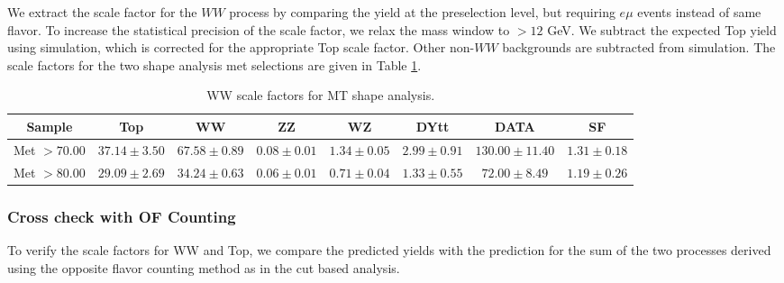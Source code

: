 We extract the scale factor for the $WW$ process by comparing the
yield at the preselection level, but requiring $e\mu$ events instead
of same flavor. 
To increase the statistical precision of the scale factor,
we relax the mass window to $>12$ GeV.
We subtract the expected Top yield using simulation, which is 
corrected for the appropriate Top scale factor.  
Other non-$WW$ backgrounds are subtracted from simulation.
The scale factors for the two shape analysis met selections
are given in Table \ref{tab:yield_of_0jet_wwsf}.

\begin{table}[!ht]
\begin{center}
\small{
\begin{tabular}{c|c|c|c|c|c|c|c}
\hline
Sample & Top & WW & ZZ & WZ & DYtt & DATA & SF \\ \hline
Met $> 70.00$ & $37.14 \pm 3.50$ & $67.58 \pm 0.89$ & $0.08 \pm 0.01$ & $1.34 \pm 0.05$ & $2.99 \pm 0.91$ & $130.00 \pm 11.40$ & $1.31 \pm 0.18$ \\ \hline
Met $> 80.00$ & $29.09 \pm 2.69$ & $34.24 \pm 0.63$ & $0.06 \pm 0.01$ & $0.71 \pm 0.04$ & $1.33 \pm 0.55$ & $72.00 \pm 8.49$ & $1.19 \pm 0.26$ \\ \hline
\end{tabular}
\caption{WW scale factors for MT shape analysis.}
\label{tab:yield_of_0jet_wwsf}}
\end{center}
\end{table}

\subsubsection{Cross check with OF Counting}

To verify the scale factors for WW and Top, we compare the predicted yields with the prediction
for the sum of the two processes derived using the opposite flavor counting method
as in the cut based analysis.


